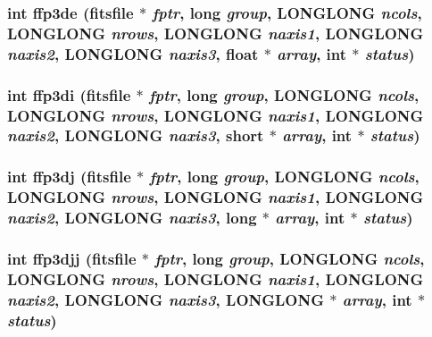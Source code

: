 \subsubsection{\setlength{\rightskip}{0pt plus 5cm}int ffp3de (\bf{fitsfile} $\ast$ {\em fptr}, long {\em group}, \bf{LONGLONG} {\em ncols}, \bf{LONGLONG} {\em nrows}, \bf{LONGLONG} {\em naxis1}, \bf{LONGLONG} {\em naxis2}, \bf{LONGLONG} {\em naxis3}, float $\ast$ {\em array}, int $\ast$ {\em status})}\label{fitsio__64_8h_47bab14919cfc2b7d34df2117c7dfdaa}


\subsubsection{\setlength{\rightskip}{0pt plus 5cm}int ffp3di (\bf{fitsfile} $\ast$ {\em fptr}, long {\em group}, \bf{LONGLONG} {\em ncols}, \bf{LONGLONG} {\em nrows}, \bf{LONGLONG} {\em naxis1}, \bf{LONGLONG} {\em naxis2}, \bf{LONGLONG} {\em naxis3}, short $\ast$ {\em array}, int $\ast$ {\em status})}\label{fitsio__64_8h_61b77356b3271c147b6d8cef61a762ab}


\subsubsection{\setlength{\rightskip}{0pt plus 5cm}int ffp3dj (\bf{fitsfile} $\ast$ {\em fptr}, long {\em group}, \bf{LONGLONG} {\em ncols}, \bf{LONGLONG} {\em nrows}, \bf{LONGLONG} {\em naxis1}, \bf{LONGLONG} {\em naxis2}, \bf{LONGLONG} {\em naxis3}, long $\ast$ {\em array}, int $\ast$ {\em status})}\label{fitsio__64_8h_282e156fee640697324c7fcb6c5f1edf}


\subsubsection{\setlength{\rightskip}{0pt plus 5cm}int ffp3djj (\bf{fitsfile} $\ast$ {\em fptr}, long {\em group}, \bf{LONGLONG} {\em ncols}, \bf{LONGLONG} {\em nrows}, \bf{LONGLONG} {\em naxis1}, \bf{LONGLONG} {\em naxis2}, \bf{LONGLONG} {\em naxis3}, \bf{LONGLONG} $\ast$ {\em array}, int $\ast$ {\em status})}\label{fitsio__64_8h_4b7964ba335cd471910d79a4055aeb1d}


